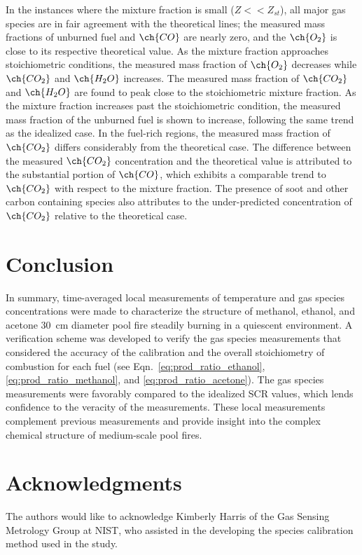 \documentclass[12pt]{article}
\begin{document}
In the instances where the mixture fraction is small ($Z<<Z_{st}$), all major gas species are in fair agreement with the theoretical lines; the measured mass fractions of unburned fuel and $\ch{CO}$ are nearly zero, and the $\ch{O_2}$ is close to its respective theoretical value. As the mixture fraction approaches stoichiometric conditions, the measured mass fraction of $\ch{O_{2}}$ decreases while $\ch{CO_{2}}$ and $\ch{H_{2}O}$ increases. The measured mass fraction of $\ch{CO_{2}}$ and $\ch{H_{2}O}$ are found to peak close to the stoichiometric mixture fraction. As the mixture fraction increases past the stoichiometric condition, the measured mass fraction of the unburned fuel is shown to increase, following the same trend as the idealized case. In the fuel-rich regions, the measured mass fraction of $\ch{CO_{2}}$ differs considerably from the theoretical case. The difference between the measured $\ch{CO_{2}}$ concentration and the theoretical value is attributed to the substantial portion of $\ch{CO}$, which exhibits a comparable trend to $\ch{CO_{2}}$ with respect to the mixture fraction. The presence of soot and other carbon containing species also attributes to the under-predicted concentration of $\ch{CO_{2}}$ relative to the theoretical case.




\clearpage

\section{Conclusion}
\label{sec:Conclusion}
In summary, time-averaged local measurements of temperature and gas species concentrations were made to characterize the structure of methanol, ethanol, and acetone \SI{30}{cm} diameter pool fire steadily burning in a quiescent environment. A verification scheme was developed to verify the gas species measurements that considered  the accuracy of the calibration and the overall stoichiometry of combustion for each fuel (see Eqn.~\ref{eq:prod_ratio_ethanol}, \ref{eq:prod_ratio_methanol}, and \ref{eq:prod_ratio_acetone}). The gas species measurements were favorably compared to the idealized SCR values, which lends confidence to the veracity of the measurements. These local measurements complement previous measurements and provide insight into the complex chemical structure of medium-scale pool fires.

\section*{Acknowledgments}
\noindent The authors would like to acknowledge Kimberly Harris of the Gas Sensing Metrology Group at NIST, who assisted in the developing the species calibration method used in the study.
\pagebreak
\end{document}
